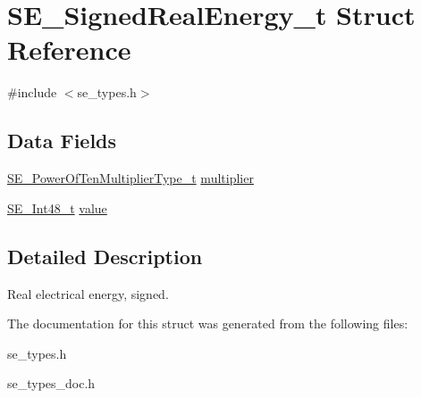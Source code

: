 \hypertarget{structSE__SignedRealEnergy__t}{}\section{S\+E\+\_\+\+Signed\+Real\+Energy\+\_\+t Struct Reference}
\label{structSE__SignedRealEnergy__t}


{\ttfamily \#include $<$se\+\_\+types.\+h$>$}

\subsection*{Data Fields}
\begin{DoxyCompactItemize}
\item 
\hyperlink{group__PowerOfTenMultiplierType_gaf0317b781dc8dbb9cb6ac4e44a14fdef}{S\+E\+\_\+\+Power\+Of\+Ten\+Multiplier\+Type\+\_\+t} \hyperlink{group__SignedRealEnergy_gad4a20cecc5be12f8890fd35bb178b064}{multiplier}
\item 
\hyperlink{group__Int48_ga87620025dc9f6c732fa48fcab95861ce}{S\+E\+\_\+\+Int48\+\_\+t} \hyperlink{group__SignedRealEnergy_ga49903bd75921418f4be2e023e5ec502f}{value}
\end{DoxyCompactItemize}


\subsection{Detailed Description}
Real electrical energy, signed. 

The documentation for this struct was generated from the following files\+:\begin{DoxyCompactItemize}
\item 
se\+\_\+types.\+h\item 
se\+\_\+types\+\_\+doc.\+h\end{DoxyCompactItemize}
